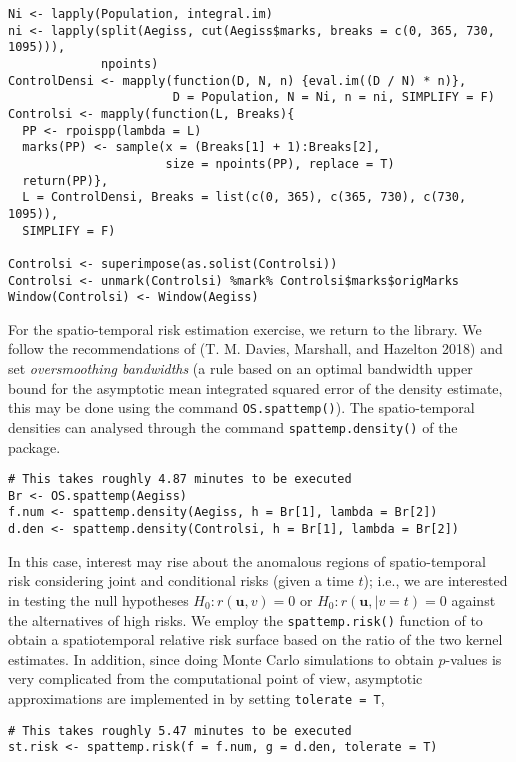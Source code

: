 \begin{verbatim}
Ni <- lapply(Population, integral.im)
ni <- lapply(split(Aegiss, cut(Aegiss$marks, breaks = c(0, 365, 730, 1095))), 
             npoints)
ControlDensi <- mapply(function(D, N, n) {eval.im((D / N) * n)}, 
                       D = Population, N = Ni, n = ni, SIMPLIFY = F)
Controlsi <- mapply(function(L, Breaks){
  PP <- rpoispp(lambda = L)
  marks(PP) <- sample(x = (Breaks[1] + 1):Breaks[2], 
                      size = npoints(PP), replace = T)
  return(PP)}, 
  L = ControlDensi, Breaks = list(c(0, 365), c(365, 730), c(730, 1095)), 
  SIMPLIFY = F)

Controlsi <- superimpose(as.solist(Controlsi))
Controlsi <- unmark(Controlsi) %mark% Controlsi$marks$origMarks
Window(Controlsi) <- Window(Aegiss)
\end{verbatim}

For the spatio-temporal risk estimation exercise, we return to the  library. We follow the recommendations of (T. M. Davies, Marshall, and Hazelton 2018) and set \emph{oversmoothing bandwidths} (a rule based on an optimal bandwidth upper bound for the asymptotic mean integrated squared error of the density estimate, this may be done using the command \texttt{OS.spattemp()}). The spatio-temporal densities can analysed through the command \texttt{spattemp.density()} of the  package.

\begin{verbatim}
# This takes roughly 4.87 minutes to be executed
Br <- OS.spattemp(Aegiss)
f.num <- spattemp.density(Aegiss, h = Br[1], lambda = Br[2])
d.den <- spattemp.density(Controlsi, h = Br[1], lambda = Br[2])
\end{verbatim}

In this case, interest may rise about the anomalous regions of spatio-temporal risk considering joint and conditional risks (given a time \(t\)); i.e., we are interested in testing the null hypotheses \(H_0:r(\mathbf{u},v)=0\) or \(H_0:r(\mathbf{u},|v=t)=0\) against the alternatives of high risks. We employ the \texttt{spattemp.risk()} function of  to obtain a spatiotemporal relative risk surface based on the ratio of the two kernel estimates. In addition, since doing Monte Carlo simulations to obtain \(p\)-values is very complicated from the computational point of view, asymptotic approximations are implemented in  by setting \texttt{\textquotesingle{}tolerate\textquotesingle{}\ =\ T},

\begin{verbatim}
# This takes roughly 5.47 minutes to be executed
st.risk <- spattemp.risk(f = f.num, g = d.den, tolerate = T)
\end{verbatim}


